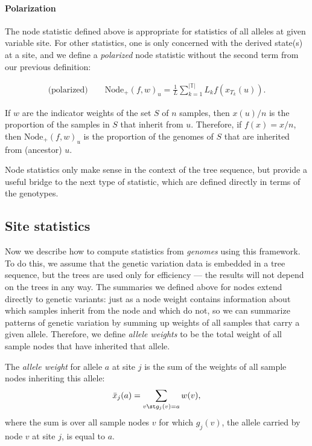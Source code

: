 \documentclass{article}
\newcommand{\nodep}{\mbox{Node}_+} %
\newcommand{\treeseq}{\mathbb{T}} %
\newcommand{\iw}{w} %
\newcommand{\nw}{x} %
\newcommand{\aw}{{\bar x}} %
\begin{document}
\paragraph{Polarization}
The node statistic defined above is appropriate for statistics of all alleles at given variable site.
For other statistics, one is only concerned with the derived state(s) at a site,
and we define a \emph{polarized} node statistic without the second term from our previous definition:

\begin{align}
    \text{(polarized)} \qquad
    \nodep(f, \iw)_u
    =
    \frac{1}{L} \sum_{k=1}^{|\treeseq|} L_k f(\nw_{T_k}(u)) .
\end{align}

\begin{example} \label{ex:ancestry_props} 
    If $\iw$ are the indicator weights of the set $S$ of $n$ samples,
    then $\nw(u) / n$ is the proportion of the samples in $S$ that inherit from $u$.
    Therefore, if $f(x) = x / n$,
    then $\nodep(f, \iw)_u$ is the proportion of the genomes of $S$
    that are inherited from (ancestor) $u$.
\end{example}

Node statistics only make sense in the context of the tree sequence,
but provide a useful bridge to the next type of statistic,
which are defined directly in terms of the genotypes.


\subsection*{Site statistics}

Now we describe how to compute statistics from \emph{genomes} using this framework.
To do this, we assume that the genetic variation data is embedded in a tree sequence,
but the trees are used only for efficiency --- the results will not depend on
the trees in any way. The summaries we defined above for nodes
extend directly to genetic variants: just as a node weight contains information about
which samples inherit from the node and which do not,
so we can summarize patterns of genetic variation by summing up weights of all samples
that carry a given allele.
Therefore, we define \emph{allele weights} to be
the total weight of all sample nodes that have inherited that allele.

\begin{definition}
    The \emph{allele weight} for allele $a$ at site $j$ is the sum of the weights
    of all sample nodes inheriting this allele:
    \begin{align*}
        \aw_j(a) = \sum_{v \st g_j(v) = a} \iw(v) ,
    \end{align*}
    where the sum is over all sample nodes $v$ for which
    $g_j(v)$, the allele carried by node $v$ at site $j$, is equal to $a$.
\end{definition}
\end{document}
